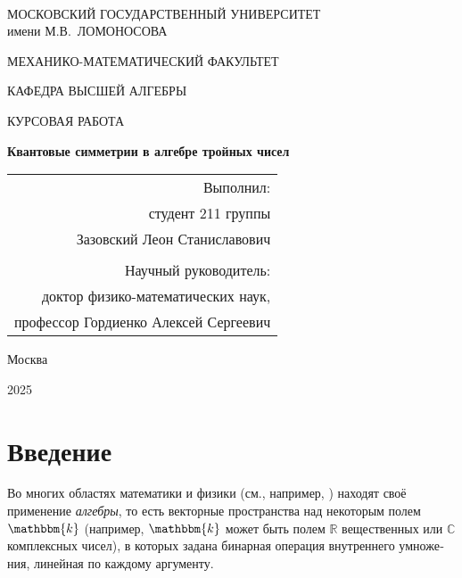 \documentclass[12pt, reqno, a4paper, oneside, notitlepage]{amsart}
\theoremstyle{mytheoremstyle}
\theoremstyle{myremarkstyle}
\numberwithin{equation}{section}
\begin{document}
{\fontsize{14pt}{18}\selectfont
  
  \thispagestyle{empty}
  \begin{center}
		
		\vfill\vfill \ \\ {%
			МОСКОВСКИЙ ГОСУДАРСТВЕННЫЙ УНИВЕРСИТЕТ \\
			имени М.В.~ЛОМОНОСОВА
			
			\medskip
			
			МЕХАНИКО-МАТЕМАТИЧЕСКИЙ ФАКУЛЬТЕТ

			\medskip
			
			
			КАФЕДРА ВЫСШЕЙ АЛГЕБРЫ

		}



{%
	\vfill {%
		
		КУРСОВАЯ РАБОТА
		
	}
		
		
		\vfill{\Large
			\textbf{Квантовые симметрии \linebreak в алгебре тройных чисел} 
		}
		
			

			\vfill
			\begin{flushright}
				\begin{tabular}{r}
					Выполнил:\\
студент 211 группы \\
Зазовский Леон Станиславович
					\\
					\\
					Научный руководитель: \\
					доктор физико-математических наук, \\
					профессор Гордиенко Алексей Сергеевич
				\end{tabular}
			\end{flushright}
			
		}
		
		\vfill\vfill\vfill\vfill 
		
		Москва
		
		 2025
	\end{center}
}

\newpage

\thispagestyle{empty}
\tableofcontents

\newpage

\pagestyle{plain}
\section{Введение}

Во многих областях математики и физики (см., например, \cite{ArnoldBook, ModernGeometry, MurphyBook, HaagKastler}) находят своё применение \textit{алгебры}, то есть векторные пространства над некоторым полем $\mathbbm{k}$ (например, $\mathbbm{k}$ может быть полем $\mathbb{R}$ вещественных или $\mathbb{C}$ комплексных чисел), в которых задана бинарная операция внутреннего умноже­ния, линейная по каждому аргументу. 
\end{document}
